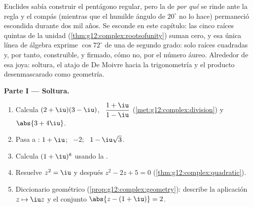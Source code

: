 \begin{problem}
\label{pb:g12:complex:1}
Euclides sabía construir el pentágono regular, pero la  de \emph{por
qué} se rinde ante la regla y el compás (mientras que el humilde ángulo de
$20^\circ$ no lo hace) permaneció escondida durante dos mil años. Se
esconde en este capítulo: las cinco raíces quintas de la unidad
(\cref{thm:g12:complex:rootsofunity}) suman cero, y esa única línea de
álgebra exprime $\cos 72^\circ$ de una  de segundo grado: solo
raíces cuadradas y, por tanto, construible, y firmado, cómo no, por el
número áureo. Alrededor de esa joya: soltura, el atajo de De Moivre hacia la
trigonometría y el producto desenmascarado como geometría.

\medskip
\noindent\textbf{Parte I --- Soltura.}
\begin{enumerate}
  \item Calcula $(2 + \iu)(3 - \iu)$, \ $\dfrac{1 + \iu}{1 - \iu}$
        (\cref{met:g12:complex:division}) y $\abs{3 + 4\iu}$.
  \item Pasa a : $1 + \iu$; \ $-2$; \
        $1 - \iu\sqrt3$.
  \item Calcula $(1 + \iu)^8$ usando la .
  \item Resuelve $z^2 = \iu$ y después $z^2 - 2z + 5 = 0$
        (\cref{thm:g12:complex:quadratic}).
  \item Diccionario geométrico (\cref{prop:g12:complex:geometry}): describe
        la aplicación $z \mapsto \iu z$ y el conjunto
        $\abs{z - (1 + \iu)} = 2$.
\end{enumerate}


\end{problem}
